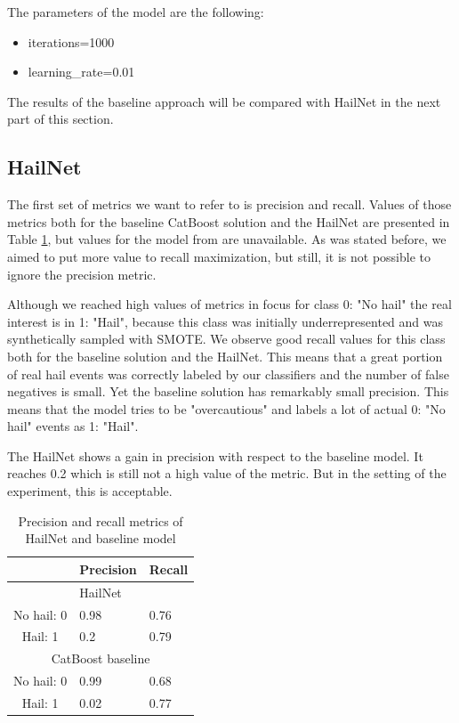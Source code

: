 \documentclass[conference]{IEEEtran}
\begin{document}
The parameters of the model are the following:
\begin{itemize}
\item iterations=1000
\item learning\_rate=0.01
\end{itemize}

The results of the baseline approach will be compared with HailNet in the next part of this section.

\subsection{HailNet}

The first set of metrics we want to refer to is precision and recall. Values of those metrics both for the baseline CatBoost solution and the HailNet are presented in Table \ref{tab: Contingency table}, but values for the model from \cite{PREIN201810} are unavailable. As was stated before, we aimed to put more value to recall maximization, but still, it is not possible to ignore the precision metric. 

Although we reached high values of metrics in focus for class 0: "No hail" the real interest is in 1: "Hail", because this class was initially underrepresented and was synthetically sampled with SMOTE. We observe good recall values for this class both for the baseline solution and the HailNet. This means that a great portion of real hail events was correctly labeled by our classifiers and the number of false negatives is small. Yet the baseline solution has remarkably small precision. This means that the model tries to be "overcautious" and labels a lot of actual 0: "No hail" events as 1: "Hail". 

The HailNet shows a gain in precision with respect to the baseline model. It reaches 0.2 which is still not a high value of the metric. But in the setting of the experiment, this is acceptable. 

\begin{table}[htbp]
\caption{Precision and recall metrics of HailNet and baseline model }
\begin{center}
\begin{tabular}{|cll|}
\hline
\multicolumn{1}{|c|}{} & \multicolumn{1}{l|}{Precision} & Recall \\ \hline
\multicolumn{3}{|c|}{HailNet} \\ \hline
\multicolumn{1}{|c|}{No hail: 0} & \multicolumn{1}{l|}{0.98} & 0.76 \\ \hline
\multicolumn{1}{|c|}{Hail: 1} & \multicolumn{1}{l|}{0.2} & 0.79 \\ \hline
\multicolumn{3}{|c|}{CatBoost baseline} \\ \hline
\multicolumn{1}{|c|}{No hail: 0} & \multicolumn{1}{l|}{0.99} & 0.68 \\ \hline
\multicolumn{1}{|c|}{Hail: 1} & \multicolumn{1}{l|}{0.02} & 0.77 \\ \hline
\end{tabular}
\label{tab: Contingency table}
\end{center}
\end{table}
\end{document}

